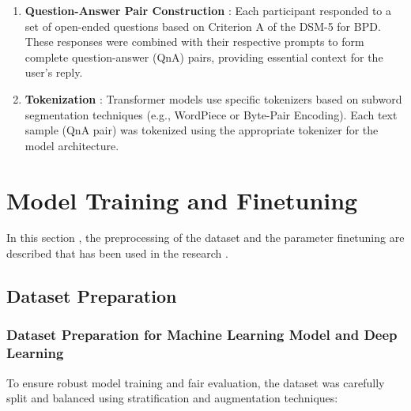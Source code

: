 \begin{enumerate}
    \item \textbf{Question-Answer Pair Construction} : Each participant responded to a set of open-ended questions based on Criterion A of the DSM-5 for BPD. These responses were combined with their respective prompts to form complete question-answer (QnA) pairs, providing essential context for the user’s reply. 

    \item \textbf{Tokenization} : Transformer models use specific tokenizers based on subword segmentation techniques (e.g., WordPiece or Byte-Pair Encoding). Each text sample (QnA pair) was tokenized using the appropriate tokenizer for the model architecture.     
\end{enumerate}

\section{Model Training and Finetuning}
In this section , the preprocessing of the dataset and the parameter finetuning are described that has been used in the research .  
\subsection{Dataset Preparation}
\subsubsection{Dataset Preparation for Machine Learning Model and Deep Learning}
To ensure robust model training and fair evaluation, the dataset was carefully split and balanced using stratification and augmentation techniques:

